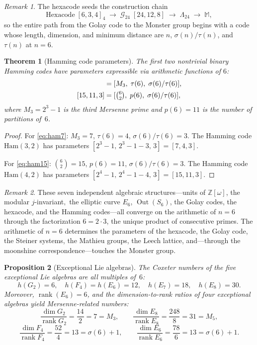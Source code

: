 \documentclass[11pt]{amsart}
\newtheorem{theorem}{Theorem}
\newtheorem{proposition}[theorem]{Proposition}
\theoremstyle{remark}
\newtheorem*{remark}{Remark}
\begin{document}
\begin{remark}
The hexacode seeds the construction chain
\[
  \text{Hexacode}\;[6,3,4]_4
  \;\longrightarrow\; \mathcal{G}_{24}\;[24,12,8]
  \;\longrightarrow\; \Lambda_{24}
  \;\longrightarrow\; \mathbb{M},
\]
so the entire path from the Golay code to the Monster group
begins with a code whose length, dimension, and minimum distance
are $n$, $\sigma(n)/\tau(n)$, and $\tau(n)$ at $n = 6$.
\end{remark}

\begin{theorem}[Hamming code parameters]\label{thm:hamming}
The first two nontrivial binary Hamming codes have parameters
expressible via arithmetic functions of $6$:
\begin{align}
  [7, 4, 3] &= [M_3,\; \tau(6),\; \sigma(6)/\tau(6)], \label{eq:ham7}\\
  [15, 11, 3] &= [\tbinom{6}{2},\; p(6),\; \sigma(6)/\tau(6)], \label{eq:ham15}
\end{align}
where $M_3 = 2^3 - 1$ is the third Mersenne prime and $p(6) = 11$
is the number of partitions of~$6$.
\end{theorem}

\begin{proof}
For \eqref{eq:ham7}: $M_3 = 7$, $\tau(6) = 4$, $\sigma(6)/\tau(6) = 3$.
The Hamming code $\mathrm{Ham}(3,2)$ has parameters $[2^3-1,\, 2^3-1-3,\, 3] = [7,4,3]$.

For \eqref{eq:ham15}: $\binom{6}{2} = 15$, $p(6) = 11$, $\sigma(6)/\tau(6) = 3$.
The Hamming code $\mathrm{Ham}(4,2)$ has parameters $[2^4-1,\, 2^4-1-4,\, 3] = [15,11,3]$.
\end{proof}

\begin{remark}
These seven independent algebraic structures---units of
$\mathbb{Z}[\omega]$, the modular $j$-invariant$,$
the elliptic curve $E_6$, $\operatorname{Out}(S_6)$,
the Golay codes, the hexacode, and the Hamming codes---all
converge on the arithmetic of $n = 6$
through the factorization $6 = 2 \cdot 3$,
the unique product of consecutive primes.
The arithmetic of $n = 6$ determines the parameters of the hexacode,
the Golay code, the Steiner systems, the Mathieu groups, the Leech lattice,
and---through the moonshine correspondence---touches the Monster group.
\end{remark}

\begin{proposition}[Exceptional Lie algebras]\label{prop:lie}
The Coxeter numbers of the five exceptional Lie algebras are all
multiples of~$6$:
\[
  h(G_2) = 6,\quad h(F_4) = h(E_6) = 12,\quad h(E_7) = 18,\quad h(E_8) = 30.
\]
Moreover, $\operatorname{rank}(E_6) = 6$, and the dimension-to-rank ratios
of four exceptional algebras yield Mersenne-related numbers:
\[
  \frac{\dim G_2}{\operatorname{rank} G_2} = \frac{14}{2} = 7 = M_3,\qquad
  \frac{\dim E_8}{\operatorname{rank} E_8} = \frac{248}{8} = 31 = M_5,
\]
\[
  \frac{\dim F_4}{\operatorname{rank} F_4} = \frac{52}{4} = 13 = \sigma(6)+1,\qquad
  \frac{\dim E_6}{\operatorname{rank} E_6} = \frac{78}{6} = 13 = \sigma(6)+1.
\]
\end{proposition}
\end{document}
